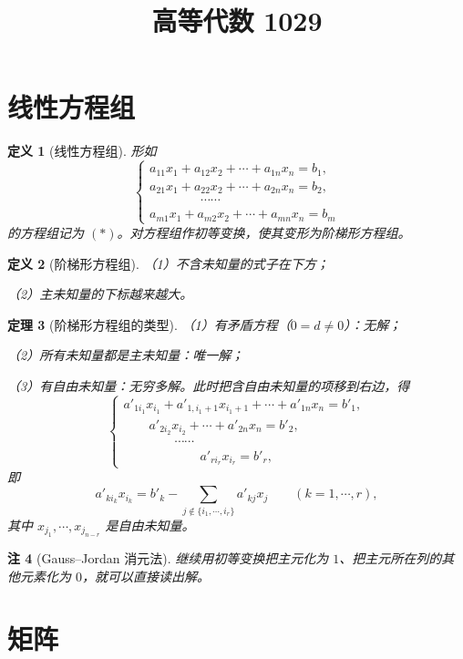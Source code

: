 \documentclass[UTF8,11pt]{ctexart}
\title{高等代数 1029}
\date{}
\theoremstyle{cnthm}
\newtheorem{thm}{定理}[section]
\newtheorem{defn}[thm]{定义}
\newtheorem{rem}[thm]{注}
\begin{document}
\maketitle

\section{线性方程组}

\begin{defn}[线性方程组]
形如
\[
\begin{cases}
a_{11}x_1 + a_{12}x_2 + \cdots + a_{1n}x_n = b_1,\\
a_{21}x_1 + a_{22}x_2 + \cdots + a_{2n}x_n = b_2,\\
\qquad\qquad \cdots\cdots\\
a_{m1}x_1 + a_{m2}x_2 + \cdots + a_{mn}x_n = b_m
\end{cases}
\]
的方程组记为 $(*)$。对方程组作初等变换，使其变形为阶梯形方程组。
\end{defn}

\begin{defn}[阶梯形方程组]
（1）不含未知量的式子在下方；

（2）主未知量的下标越来越大。
\end{defn}

\begin{thm}[阶梯形方程组的类型]
（1）有矛盾方程（$0=d\neq0$）：无解；

（2）所有未知量都是主未知量：唯一解；

（3）有自由未知量：无穷多解。此时把含自由未知量的项移到右边，得
\[
\begin{cases}
a'_{1i_1}x_{i_1} + a'_{1,i_1+1}x_{i_1+1} + \cdots + a'_{1n}x_n = b'_1,\\
\qquad a'_{2i_2}x_{i_2} + \cdots + a'_{2n}x_n = b'_2,\\
\qquad\qquad \cdots\cdots\\
\qquad\qquad\qquad a'_{ri_r}x_{i_r} = b'_r,
\end{cases}
\]
即
\[
a'_{ki_k}x_{i_k} = b'_k-\sum_{j\notin\{i_1,\cdots,i_r\}} a'_{kj}x_j
\qquad(k=1,\cdots,r),
\]
其中 $x_{j_1},\cdots,x_{j_{n-r}}$ 是自由未知量。
\end{thm}

\begin{rem}[Gauss--Jordan 消元法]
继续用初等变换把主元化为 $1$、把主元所在列的其他元素化为 $0$，就可以直接读出解。
\end{rem}

\section{矩阵}
\end{document}
